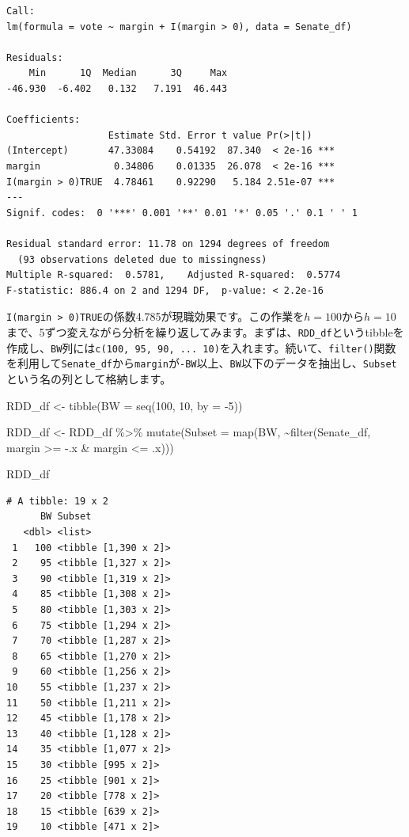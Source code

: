 \documentclass[
  a4paper,
  pandoc,
  ja=standard,
  jafont=haranoaji]{bxjsbook}
\newenvironment{Shaded}{\begin{snugshade}}{\end{snugshade}}
\newcommand{\AttributeTok}[1]{\textcolor[rgb]{0.00,0.48,0.65}{#1}}
\newcommand{\DecValTok}[1]{\textcolor[rgb]{0.68,0.00,0.00}{#1}}
\newcommand{\FunctionTok}[1]{\textcolor[rgb]{0.28,0.35,0.67}{#1}}
\newcommand{\NormalTok}[1]{\textcolor[rgb]{0.00,0.48,0.65}{#1}}
\newcommand{\OtherTok}[1]{\textcolor[rgb]{0.00,0.48,0.65}{#1}}
\newcommand{\SpecialCharTok}[1]{\textcolor[rgb]{0.37,0.37,0.37}{#1}}
\begin{document}
\begin{verbatim}
Call:
lm(formula = vote ~ margin + I(margin > 0), data = Senate_df)

Residuals:
    Min      1Q  Median      3Q     Max 
-46.930  -6.402   0.132   7.191  46.443 

Coefficients:
                  Estimate Std. Error t value Pr(>|t|)    
(Intercept)       47.33084    0.54192  87.340  < 2e-16 ***
margin             0.34806    0.01335  26.078  < 2e-16 ***
I(margin > 0)TRUE  4.78461    0.92290   5.184 2.51e-07 ***
---
Signif. codes:  0 '***' 0.001 '**' 0.01 '*' 0.05 '.' 0.1 ' ' 1

Residual standard error: 11.78 on 1294 degrees of freedom
  (93 observations deleted due to missingness)
Multiple R-squared:  0.5781,    Adjusted R-squared:  0.5774 
F-statistic: 886.4 on 2 and 1294 DF,  p-value: < 2.2e-16
\end{verbatim}

\texttt{I(margin\ \textgreater{}\ 0)TRUE}の係数4.785が現職効果です。この作業を\(h = 100\)から\(h = 10\)まで、5ずつ変えながら分析を繰り返してみます。まずは、\texttt{RDD\_df}というtibbleを作成し、\texttt{BW}列には\texttt{c(100,\ 95,\ 90,\ ...\ 10)}を入れます。続いて、\texttt{filter()}関数を利用して\texttt{Senate\_df}から\texttt{margin}が\texttt{-BW}以上、\texttt{BW}以下のデータを抽出し、\texttt{Subset}という名の列として格納します。

\begin{Shaded}
\begin{Highlighting}[numbers=left,,]
\NormalTok{RDD\_df }\OtherTok{\textless{}{-}} \FunctionTok{tibble}\NormalTok{(}\AttributeTok{BW =} \FunctionTok{seq}\NormalTok{(}\DecValTok{100}\NormalTok{, }\DecValTok{10}\NormalTok{, }\AttributeTok{by =} \SpecialCharTok{{-}}\DecValTok{5}\NormalTok{))}

\NormalTok{RDD\_df }\OtherTok{\textless{}{-}}\NormalTok{ RDD\_df }\SpecialCharTok{\%\textgreater{}\%}
  \FunctionTok{mutate}\NormalTok{(}\AttributeTok{Subset =} \FunctionTok{map}\NormalTok{(BW, }\SpecialCharTok{\textasciitilde{}}\FunctionTok{filter}\NormalTok{(Senate\_df, }
\NormalTok{                                  margin }\SpecialCharTok{\textgreater{}=} \SpecialCharTok{{-}}\NormalTok{.x }\SpecialCharTok{\&}\NormalTok{ margin }\SpecialCharTok{\textless{}=}\NormalTok{ .x)))}

\NormalTok{RDD\_df}
\end{Highlighting}
\end{Shaded}

\begin{verbatim}
# A tibble: 19 x 2
      BW Subset              
   <dbl> <list>              
 1   100 <tibble [1,390 x 2]>
 2    95 <tibble [1,327 x 2]>
 3    90 <tibble [1,319 x 2]>
 4    85 <tibble [1,308 x 2]>
 5    80 <tibble [1,303 x 2]>
 6    75 <tibble [1,294 x 2]>
 7    70 <tibble [1,287 x 2]>
 8    65 <tibble [1,270 x 2]>
 9    60 <tibble [1,256 x 2]>
10    55 <tibble [1,237 x 2]>
11    50 <tibble [1,211 x 2]>
12    45 <tibble [1,178 x 2]>
13    40 <tibble [1,128 x 2]>
14    35 <tibble [1,077 x 2]>
15    30 <tibble [995 x 2]>  
16    25 <tibble [901 x 2]>  
17    20 <tibble [778 x 2]>  
18    15 <tibble [639 x 2]>  
19    10 <tibble [471 x 2]>  
\end{verbatim}
\end{document}
